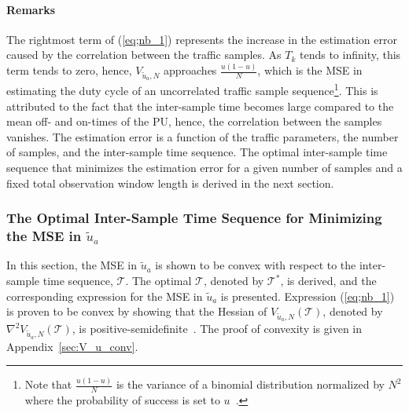 \documentclass[11pt,draftclsnofoot,journal,onecolumn]{IEEEtran}
\begin{document}
\paragraph*{Remarks}

The rightmost term of (\ref{eq;nb_1}) represents the increase in the estimation error caused by the correlation between the traffic samples. As $T_k$ tends to infinity, this term tends to zero, hence, $V_{\tilde{u}_a,N}$ approaches $\frac{u(1-u)}{N}$, which is the MSE in estimating the duty cycle of an uncorrelated traffic sample sequence\footnote{Note that $\frac{u(1-u)}{N}$ is the variance of a binomial distribution normalized by $N^2$ where the probability of success is set to $u$~\cite[Ch. 4]{prob_schaum}.}. This is attributed to the fact that the inter-sample time becomes large compared to the mean off- and on-times of the PU, hence, the correlation between the samples vanishes. The estimation error is a function of the traffic parameters, the number of samples, and the inter-sample time sequence. The optimal inter-sample time sequence that minimizes the estimation error for a given number of samples and a fixed total observation window length is derived in the next section.

\subsubsection{The Optimal Inter-Sample Time Sequence for Minimizing the MSE in $\tilde{u}_a$}
\label{sec:optim_u}

In this section, the MSE in $\tilde{u}_a$ is shown to be convex with respect to the inter-sample time sequence, $\mathcal{T}$. The optimal $\mathcal{T}$, denoted by $\mathcal{T}^*$, is derived, and the corresponding expression for the MSE in $\tilde{u}_a$ is presented. Expression (\ref{eq;nb_1}) is proven to be convex by showing that the Hessian of $V_{\tilde{u}_a,N} \left( \mathcal{T} \right)$, denoted by $\nabla^2 V_{\tilde{u}_a,N} \left( \mathcal{T} \right)$, is positive-semidefinite~\cite{berghe}. The proof of convexity is given in Appendix~\ref{sec:V_u_conv}. 
\end{document}
